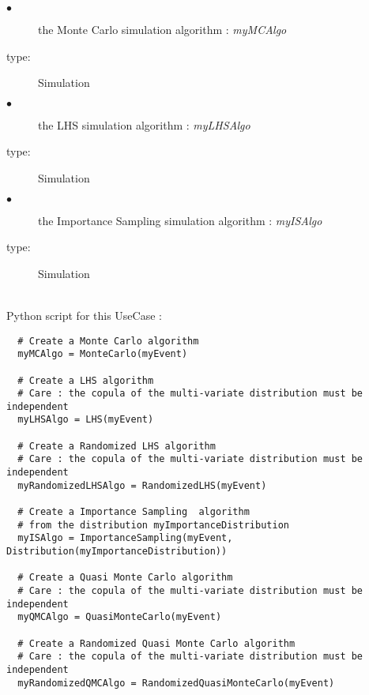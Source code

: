 {
  \begin{description}
  \item[$\bullet$] the Monte Carlo simulation algorithm : {\itshape myMCAlgo}
  \item[type:] Simulation
  \item[$\bullet$] the LHS simulation algorithm : {\itshape myLHSAlgo}
  \item[type:] Simulation
  \item[$\bullet$] the Importance Sampling simulation algorithm : {\itshape myISAlgo}
  \item[type:] Simulation
  \end{description}
}

\textspace\\
Python  script for this UseCase :

\begin{lstlisting}
  # Create a Monte Carlo algorithm
  myMCAlgo = MonteCarlo(myEvent)

  # Create a LHS algorithm
  # Care : the copula of the multi-variate distribution must be independent
  myLHSAlgo = LHS(myEvent)

  # Create a Randomized LHS algorithm
  # Care : the copula of the multi-variate distribution must be independent
  myRandomizedLHSAlgo = RandomizedLHS(myEvent)

  # Create a Importance Sampling  algorithm
  # from the distribution myImportanceDistribution
  myISAlgo = ImportanceSampling(myEvent, Distribution(myImportanceDistribution))

  # Create a Quasi Monte Carlo algorithm
  # Care : the copula of the multi-variate distribution must be independent
  myQMCAlgo = QuasiMonteCarlo(myEvent)

  # Create a Randomized Quasi Monte Carlo algorithm
  # Care : the copula of the multi-variate distribution must be independent
  myRandomizedQMCAlgo = RandomizedQuasiMonteCarlo(myEvent)

\end{lstlisting}
